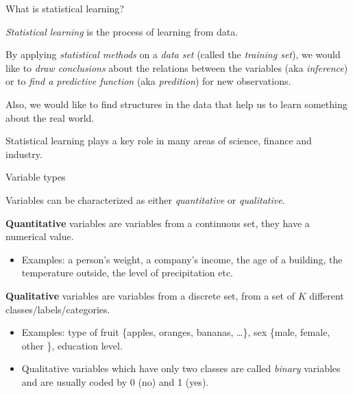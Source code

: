 \documentclass[ignorenonframetext,]{beamer}
\providecommand{\tightlist}{%
  \setlength{\itemsep}{0pt}\setlength{\parskip}{0pt}}
\begin{document}
\begin{frame}{What is statistical learning?}

\emph{Statistical learning} is the process of learning from data.

By applying \emph{statistical methods} on a \emph{data set} (called the
\emph{training set}), we would like to \emph{draw conclusions} about the
relations between the variables (aka \emph{inference}) or to \emph{find
a predictive function} (aka \emph{predition}) for new observations.

Also, we would like to find structures in the data that help us to learn
something about the real world.

Statistical learning plays a key role in many areas of science, finance
and industry.

\end{frame}

\begin{frame}

\begin{block}{Variable types}

Variables can be characterized as either \emph{quantitative} or
\emph{qualitative}.

\textbf{Quantitative} variables are variables from a continuous set,
they have a numerical value.

\begin{itemize}
\tightlist
\item
  Examples: a person's weight, a company's income, the age of a
  building, the temperature outside, the level of precipitation etc.
\end{itemize}

\textbf{Qualitative} variables are variables from a discrete set, from a
set of \(K\) different classes/labels/categories.

\begin{itemize}
\item
  Examples: type of fruit \{apples, oranges, bananas, \ldots{}\}, sex
  \{male, female, other \}, education level.
\item
  Qualitative variables which have only two classes are called
  \emph{binary} variables and are usually coded by 0 (no) and 1 (yes).
\end{itemize}

\end{block}

\end{frame}
\end{document}
